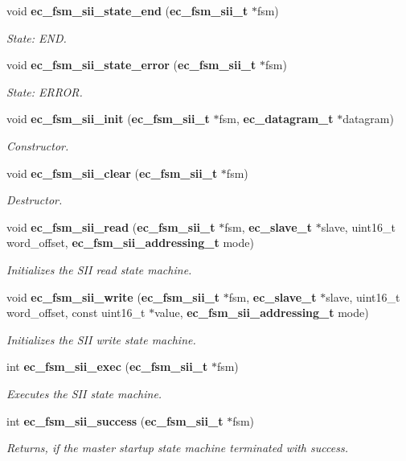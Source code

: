 \begin{DoxyCompactItemize}
void {\bf ec\-\_\-fsm\-\_\-sii\-\_\-state\-\_\-end} ({\bf ec\-\_\-fsm\-\_\-sii\-\_\-t} $\ast$fsm)
\begin{DoxyCompactList}\small\item\em State\-: E\-N\-D. \end{DoxyCompactList}\item 
void {\bf ec\-\_\-fsm\-\_\-sii\-\_\-state\-\_\-error} ({\bf ec\-\_\-fsm\-\_\-sii\-\_\-t} $\ast$fsm)
\begin{DoxyCompactList}\small\item\em State\-: E\-R\-R\-O\-R. \end{DoxyCompactList}\item 
void {\bf ec\-\_\-fsm\-\_\-sii\-\_\-init} ({\bf ec\-\_\-fsm\-\_\-sii\-\_\-t} $\ast$fsm, {\bf ec\-\_\-datagram\-\_\-t} $\ast$datagram)
\begin{DoxyCompactList}\small\item\em Constructor. \end{DoxyCompactList}\item 
void {\bf ec\-\_\-fsm\-\_\-sii\-\_\-clear} ({\bf ec\-\_\-fsm\-\_\-sii\-\_\-t} $\ast$fsm)
\begin{DoxyCompactList}\small\item\em Destructor. \end{DoxyCompactList}\item 
void {\bf ec\-\_\-fsm\-\_\-sii\-\_\-read} ({\bf ec\-\_\-fsm\-\_\-sii\-\_\-t} $\ast$fsm, {\bf ec\-\_\-slave\-\_\-t} $\ast$slave, uint16\-\_\-t word\-\_\-offset, {\bf ec\-\_\-fsm\-\_\-sii\-\_\-addressing\-\_\-t} mode)
\begin{DoxyCompactList}\small\item\em Initializes the S\-I\-I read state machine. \end{DoxyCompactList}\item 
void {\bf ec\-\_\-fsm\-\_\-sii\-\_\-write} ({\bf ec\-\_\-fsm\-\_\-sii\-\_\-t} $\ast$fsm, {\bf ec\-\_\-slave\-\_\-t} $\ast$slave, uint16\-\_\-t word\-\_\-offset, const uint16\-\_\-t $\ast$value, {\bf ec\-\_\-fsm\-\_\-sii\-\_\-addressing\-\_\-t} mode)
\begin{DoxyCompactList}\small\item\em Initializes the S\-I\-I write state machine. \end{DoxyCompactList}\item 
int {\bf ec\-\_\-fsm\-\_\-sii\-\_\-exec} ({\bf ec\-\_\-fsm\-\_\-sii\-\_\-t} $\ast$fsm)
\begin{DoxyCompactList}\small\item\em Executes the S\-I\-I state machine. \end{DoxyCompactList}\item 
int {\bf ec\-\_\-fsm\-\_\-sii\-\_\-success} ({\bf ec\-\_\-fsm\-\_\-sii\-\_\-t} $\ast$fsm)
\begin{DoxyCompactList}\small\item\em Returns, if the master startup state machine terminated with success. \end{DoxyCompactList}\end{DoxyCompactItemize}


